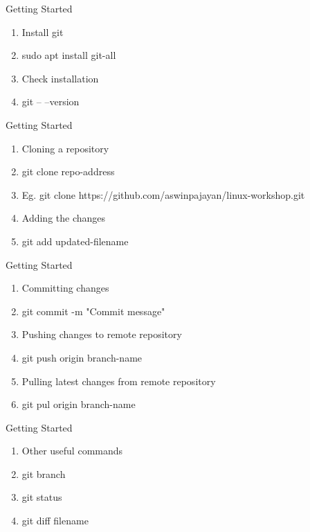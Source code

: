 \documentclass{beamer}
\newcounter{saveenumi}
\newcommand{\seti}{\setcounter{saveenumi}{\value{enumi}}}
\newcommand{\conti}{\setcounter{enumi}{\value{saveenumi}}}
\begin{document}
{\begin{frame}{Getting Started}
	\begin{enumerate}
		\item<2-> Install git
		\item<2-> sudo apt install git-all
		\item<3-> Check installation
		\item<3-> git -- --version		
	\end{enumerate}
\end{frame}

\begin{frame}{Getting Started}
	\begin{enumerate}
		\item<2-> Cloning a repository
		\item<2-> git clone repo-address
		\item<2-> Eg. git clone https://github.com/aswinpajayan/linux-workshop.git
		\item<3-> Adding the changes
		\item<3-> git add updated-filename
		\seti
	\end{enumerate}
\end{frame}

\begin{frame}{Getting Started}
	\begin{enumerate}
		\conti
		\item<2-> Committing changes
		\item<2-> git commit -m "Commit message"
		\item<3-> Pushing changes to remote repository
		\item<3-> git push origin branch-name
		\item<4-> Pulling latest changes from remote repository
		\item<4-> git pul origin branch-name
		\seti
	\end{enumerate}
\end{frame}

\begin{frame}{Getting Started}
	\begin{enumerate}
		\conti
		\item<2-> Other useful commands
		\item<2-> git branch
		\item<2-> git status
		\item<2-> git diff filename
	\end{enumerate}
\end{frame}

}
\end{document}
